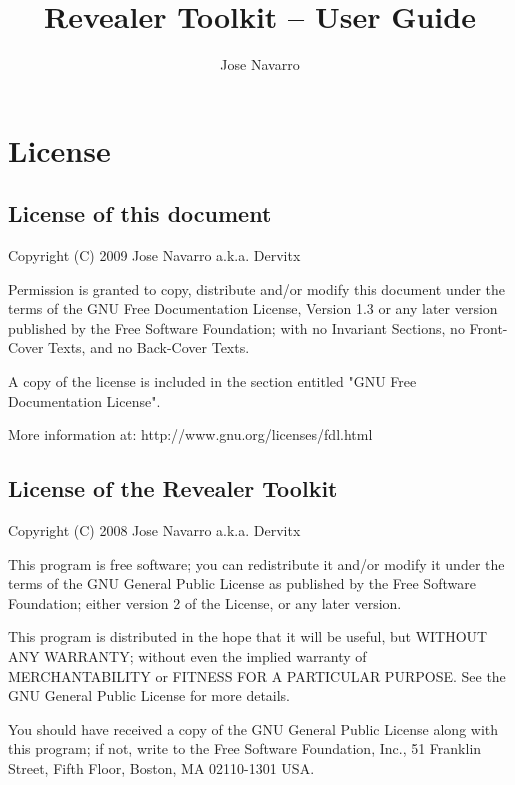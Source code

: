 \documentclass[a4paper,11pt,oneside]{report}
\title{Revealer Toolkit -- User Guide}
\author{Jose Navarro}
\begin{document}
\maketitle

\tableofcontents

\addtolength{\parskip}{0.5 \baselineskip}

\chapter{License}

\section{License of this document}

    Copyright (C) 2009 Jose Navarro a.k.a. Dervitx
    
    Permission is granted to copy, distribute and/or modify this document
    under the terms of the GNU Free Documentation License, Version 1.3
    or any later version published by the Free Software Foundation;
    with no Invariant Sections, no Front-Cover Texts, and no Back-Cover Texts.
    
    A copy of the license is included in the section entitled "GNU
    Free Documentation License".
    
    More information at: http://www.gnu.org/licenses/fdl.html

\section{License of the Revealer Toolkit}

	Copyright (C) 2008 Jose Navarro a.k.a. Dervitx

    This program is free software; you can redistribute it and/or modify
    it under the terms of the GNU General Public License as published by
    the Free Software Foundation; either version 2 of the License, or
    any later version.

    This program is distributed in the hope that it will be useful,
    but WITHOUT ANY WARRANTY; without even the implied warranty of
    MERCHANTABILITY or FITNESS FOR A PARTICULAR PURPOSE.  See the
    GNU General Public License for more details.

    You should have received a copy of the GNU General Public License along
    with this program; if not, write to the Free Software Foundation, Inc.,
    51 Franklin Street, Fifth Floor, Boston, MA 02110-1301 USA.
    
\end{document}
